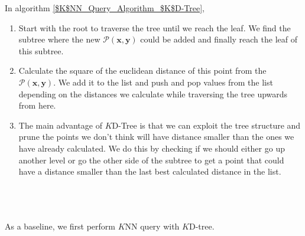In algorithm \ref{$K$NN_Query_Algorithm_$K$D-Tree},
\begin{enumerate}
    \item Start with the root to traverse the tree until we reach the leaf. We find the subtree where the new $\mathcal{P}(\boldsymbol{x}, \boldsymbol{y})$ could be added and finally reach the leaf of this subtree. 

    \item Calculate the square of the euclidean distance of this point from the $\mathcal{P}(\boldsymbol{x}, \boldsymbol{y})$. We add it to the list and push and pop values from the list depending on the distances we calculate while traversing the tree upwards from here.
    
    \item The main advantage of $K$D-Tree is that we can exploit the tree structure and prune the points we don't think will have distance smaller than the ones we have already calculated. We do this by checking if we should either go up another level or go the other side of the subtree to get a point that could have a distance smaller than the last best calculated distance in the list. \\\\\\\\

\end{enumerate}

As a baseline, we first perform $K$NN query with $K$D-tree.

